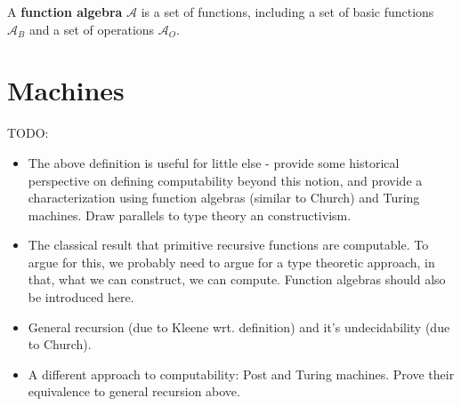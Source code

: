 \begin{definition} A \textbf{function algebra} $\mathcal{A}$ is a set of
functions, including a set of basic functions $\mathcal{A}_B$ and a set of
operations $\mathcal{A}_O$. \end{definition}

\section{Machines}

\pagebreak

TODO:

\begin{itemize}

\item The above definition is useful for little else - provide some historical
perspective on defining computability beyond this notion, and provide a
characterization using function algebras (similar to Church) and Turing
machines. Draw parallels to type theory an constructivism.

\item The classical result that primitive recursive functions are computable.
To argue for this, we probably need to argue for a type theoretic approach, in
that, what we can construct, we can compute. Function algebras should also be
introduced here.

\item General recursion (due to Kleene wrt. definition) and it's undecidability
(due to Church).

\item A different approach to computability: Post and Turing machines. Prove
their equivalence to general recursion above.

\end{itemize}



